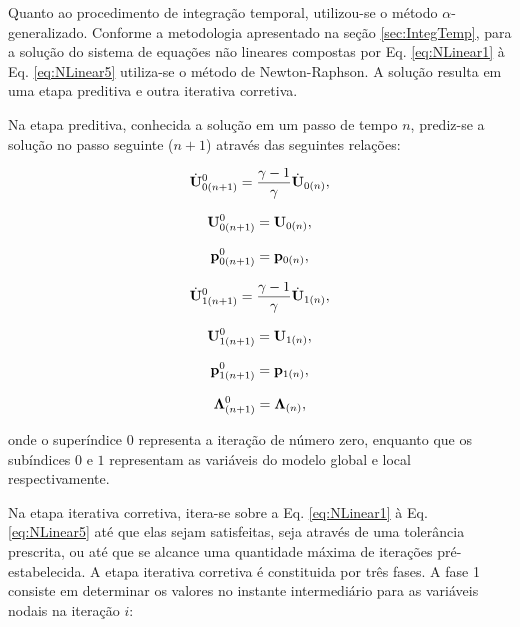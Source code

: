 \documentclass[tese_patricia]{subfiles}
\begin{document}
Quanto ao procedimento de integração temporal, utilizou-se o método $\alpha$-generalizado. Conforme a metodologia apresentado na seção \ref{sec:IntegTemp}, para a solução do sistema de equações não lineares compostas por Eq. \eqref{eq:NLinear1} à Eq. \eqref{eq:NLinear5} utiliza-se o método de Newton-Raphson. A solução resulta em uma etapa preditiva e outra iterativa corretiva.

Na etapa preditiva, conhecida a solução em um passo de tempo $n$, prediz-se a solução no passo seguinte ($n+1$) através das seguintes relações:

\begin{align}
	\dot{\mathbf{U}}_{0(n+1)}^{0} = \frac{\gamma-1}{\gamma}\dot{\mathbf{U}}_{0(n)} \label{eq:PredArlq1},
\end{align}

\begin{align}
	\mathbf{U}_{0(n+1)}^{0} = \mathbf{U}_{0(n)}, \label{eq:PredArlq2}
\end{align}

\begin{align}
	\mathbf{p}_{0(n+1)}^{0} = \mathbf{p}_{0(n)},\label{eq:PredArlq3}
\end{align}

\begin{align}
	\dot{\mathbf{U}}_{1(n+1)}^{0} = \frac{\gamma-1}{\gamma}\dot{\mathbf{U}}_{1(n)} \label{eq:PredArlq4},
\end{align}

\begin{align}
	\mathbf{U}_{1(n+1)}^{0} = \mathbf{U}_{1(n)}, \label{eq:PredArlq5}
\end{align}

\begin{align}
	\mathbf{p}_{1(n+1)}^{0} = \mathbf{p}_{1(n)},\label{eq:PredArlq6}
\end{align}

\begin{align}
	\boldsymbol{\Lambda}_{(n+1)}^{0} = \boldsymbol{\Lambda}_{(n)},\label{eq:PredArlq7}
\end{align}

\noindent onde o superíndice $0$ representa a iteração de número zero, enquanto que os subíndices $0$ e $1$ representam as variáveis do modelo global e local respectivamente.

Na etapa iterativa corretiva, itera-se sobre a Eq. \eqref{eq:NLinear1} à Eq. \eqref{eq:NLinear5} até que elas sejam satisfeitas, seja através de uma tolerância prescrita, ou até que se alcance uma quantidade máxima de iterações pré-estabelecida. A etapa iterativa corretiva é constituida por três fases. A fase 1 consiste em determinar os valores no instante intermediário para as variáveis nodais na iteração $i$:
\end{document}
